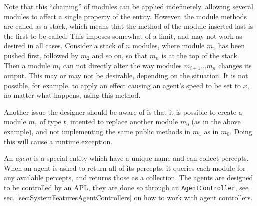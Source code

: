 Note that this ``chaining'' of modules can be applied indefinetely,
allowing several modules to affect a single property of the entity.
However, the module methods are called as a stack, which means that
the method of the module inserted last is the first to be called.
This imposes somewhat of a limit, and may not work as desired in all
cases. Consider a stack of $n$ modules, where module $m_{1}$ has
been pushed first, followed by $m_{2}$ and so on, so that $m_{n}$
is at the top of the stack. Then a module $m_{i}$ can not directly
alter the way modules $m_{i+1}\dots m_{n}$ changes its output. This
may or may not be desirable, depending on the situation. It is not
possible, for example, to apply an effect causing an agent's speed
to be set to $x$, no matter what happens, using this method.

Another issue the designer should be aware of is that it is possible
to create a module $m_{1}$ of type $t$, intented to replace another
module $m_{0}$ (as in the above example), and not implementing the
same public methods in $m_{1}$ as in $m_{0}$. Doing this will cause
a runtime exception.

An \emph{agent} is a special entity which have a unique name and can
collect percepts. When an agent is asked to return all of its percepts,
it queries each module for any available percepts, and returns those
as a collection. The agents are designed to be controlled by an APL,
they are done so through an \texttt{AgentController}, see sec. \ref{sec:SystemFeaturesAgentControllers}
on how to work with agent controllers. 
